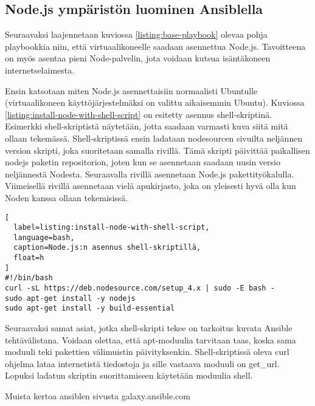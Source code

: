 \subsection{Node.js ympäristön luominen Ansiblella}

Seuraavaksi laajennetaan kuviossa \ref{listing:base-playbook} olevaa pohja playbookkia niin, että virtuaalikoneelle saadaan asennettua Node.js. Tavoitteena on myös asentaa pieni Node-palvelin, jota voidaan kutsua isäntäkoneen internetselaimesta.

Ensin katsotaan miten Node.js asennettaisiin normaalisti Ubuntulle (virtuaalikoneen käyttöjärjestelmäksi on valittu aikaisemmin Ubuntu). Kuviossa \ref{listing:install-node-with-shell-script} on esitetty asennus shell-skriptinä. Esimerkki shell-skriptistä näytetään, jotta saadaan varmasti kuva siitä mitä ollaan tekemässä. Shell-skriptissä ensin ladataan nodesourcen sivuilta neljännen version skripti, joka suoritetaan samalla rivillä. Tämä skripti päivittää paikallisen nodejs paketin repositorion, joten kun se asennetaan saadaan uusin versio neljännestä Nodesta. Seuraavalla rivillä asennetaan Node.js pakettityökalulla. Viimeisellä rivillä asennetaan vielä apukirjasto, joka on yleisesti hyvä olla kun Noden kanssa ollaan tekemisissä.

\begin{lstlisting}[
  label=listing:install-node-with-shell-script,
  language=bash,
  caption=Node.js:n asennus shell-skriptillä,
  float=h
]
#!/bin/bash
curl -sL https://deb.nodesource.com/setup_4.x | sudo -E bash -
sudo apt-get install -y nodejs
sudo apt-get install -y build-essential
\end{lstlisting}

Seuraavaksi samat asiat, jotka shell-skripti tekee on tarkoitus kuvata Ansible tehtävälistana. Voidaan olettaa, että apt-moduulia tarvitaan taas, koska sama moduuli teki pakettien välimuistin päivityksenkin. Shell-skriptissä oleva curl ohjelma lataa internetistä tiedostoja ja sille vastaava moduuli on get\_url. Lopuksi ladatun skriptin suorittamiseen käytetään moduulia shell.


Muista kertoa ansiblen sivusta galaxy.ansible.com